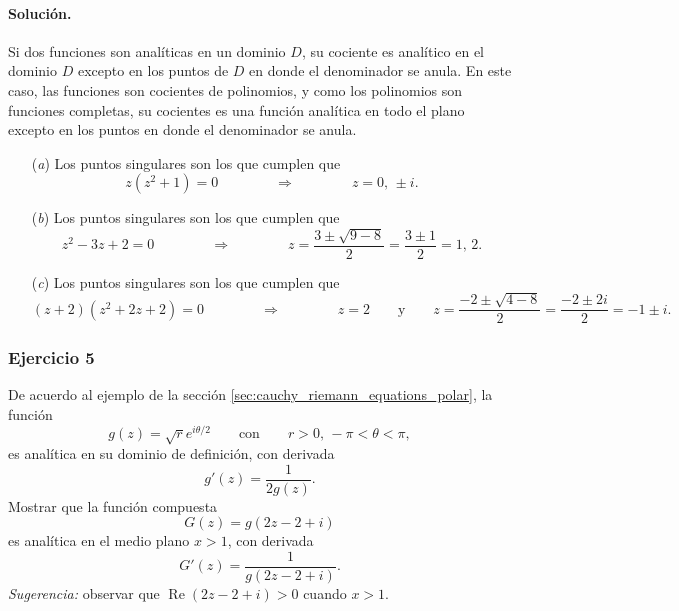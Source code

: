 \documentclass[a4paper]{report}
\renewcommand{\Re}{\operatorname{Re}}
\begin{document}
\paragraph{Solución.} Si dos funciones son analíticas en un dominio \(D\), su cociente es analítico en el dominio \(D\) excepto en los puntos de \(D\) en donde el denominador se anula. En este caso, las funciones son cocientes de polinomios, y como los polinomios son funciones completas, su cocientes es una función analítica en todo el plano excepto en los puntos en donde el denominador se anula.
\begin{enumerate}
 \item[(\textit{a})] Los puntos singulares son los que cumplen que 
 \[
  z(z^2+1)=0
  \qquad\qquad\Rightarrow\qquad\qquad
  z=0,\,\pm i.
 \]
 \item[(\textit{b})] Los puntos singulares son los que cumplen que 
 \[
  z^2-3z+2=0
  \qquad\qquad\Rightarrow\qquad\qquad
  z=\frac{3\pm\sqrt{9-8}}{2}=\frac{3\pm1}{2}=1,\,2.
 \]
 \item[(\textit{c})] Los puntos singulares son los que cumplen que 
 \[
  (z+2)(z^2+2z+2)=0
  \qquad\qquad\Rightarrow\qquad\qquad
  z=2\qquad\textrm{y}\qquad
  z=\frac{-2\pm\sqrt{4-8}}{2}=\frac{-2\pm2i}{2}=-1\pm i.
 \]
\end{enumerate}

\subsubsection{Ejercicio 5}

De acuerdo al ejemplo de la sección \ref{sec:cauchy_riemann_equations_polar}, la función
\[
 g(z)=\sqrt{r}e^{i\theta/2}\qquad\textrm{con}\qquad r>0,\,-\pi<\theta<\pi,
\]
es analítica en su dominio de definición, con derivada
\[
 g'(z)=\frac{1}{2g(z)}.
\]
Mostrar que la función compuesta 
\[
 G(z)=g(2z-2+i)
\]
es analítica en el medio plano \(x>1\), con derivada
\[
 G'(z)=\frac{1}{g(2z-2+i)}.
\]
\emph{Sugerencia:} observar que \(\Re(2z-2+i)>0\) cuando \(x>1\).
\end{document}
